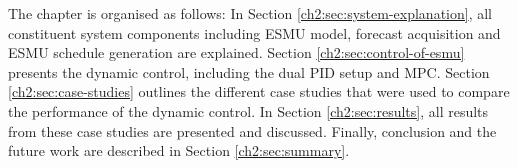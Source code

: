 The chapter is organised as follows:
In Section \ref{ch2:sec:system-explanation}, all constituent system components including ESMU model, forecast acquisition and ESMU schedule generation are explained.
Section \ref{ch2:sec:control-of-esmu} presents the dynamic control, including the dual PID setup and MPC.
Section \ref{ch2:sec:case-studies} outlines the different case studies that were used to compare the performance of the dynamic control.
In Section \ref{ch2:sec:results}, all results from these case studies are presented and discussed.
Finally, conclusion and the future work are described in Section \ref{ch2:sec:summary}.










